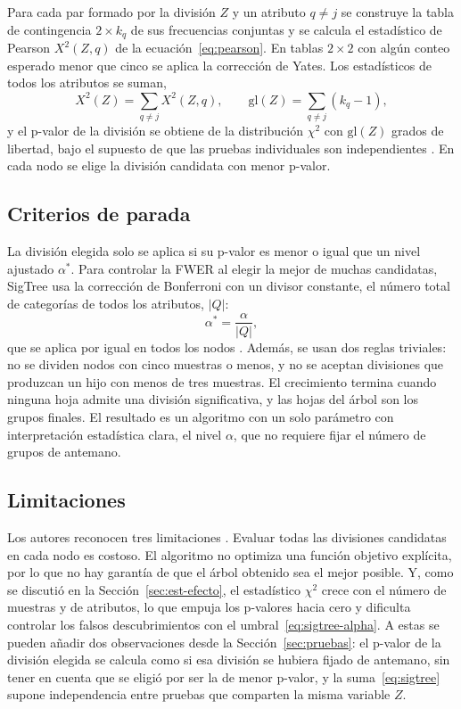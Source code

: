 Para cada par formado por la división $Z$ y un atributo $q \ne j$ se construye la
tabla de contingencia $2 \times k_q$ de sus frecuencias conjuntas y se calcula el
estadístico de Pearson $X^2(Z, q)$ de la ecuación~\eqref{eq:pearson}. En tablas
$2 \times 2$ con algún conteo esperado menor que cinco se aplica la corrección de
Yates. Los estadísticos de todos los atributos se suman,
\begin{equation}\label{eq:sigtree}
  X^2(Z) = \sum_{q \ne j} X^2(Z, q), \qquad
  \mathrm{gl}(Z) = \sum_{q \ne j} (k_q - 1),
\end{equation}
y el p-valor de la división se obtiene de la distribución $\chi^2$ con
$\mathrm{gl}(Z)$ grados de libertad, bajo el supuesto de que las pruebas
individuales son independientes \cite[Sec.~3.3]{Hu2025}. En cada nodo se elige la
división candidata con menor p-valor.

\subsection{Criterios de parada}

La división elegida solo se aplica si su p-valor es menor o igual que un nivel
ajustado $\alpha^\ast$. Para controlar la FWER al elegir la mejor de muchas
candidatas, SigTree usa la corrección de Bonferroni con un divisor constante,
el número total de categorías de todos los atributos, $|Q|$:
\begin{equation}\label{eq:sigtree-alpha}
  \alpha^\ast = \frac{\alpha}{|Q|} ,
\end{equation}
que se aplica por igual en todos los nodos \cite[Sec.~3.4]{Hu2025}. Además, se
usan dos reglas triviales: no se dividen nodos con cinco muestras o menos, y no se
aceptan divisiones que produzcan un hijo con menos de tres muestras. El
crecimiento termina cuando ninguna hoja admite una división significativa, y las
hojas del árbol son los grupos finales. El resultado es un algoritmo con un solo
parámetro con interpretación estadística clara, el nivel $\alpha$, que no
requiere fijar el número de grupos de antemano.

\subsection{Limitaciones}

Los autores reconocen tres limitaciones \cite[Sec.~5]{Hu2025}. Evaluar todas las
divisiones candidatas en cada nodo es costoso. El algoritmo no optimiza una
función objetivo explícita, por lo que no hay garantía de que el árbol obtenido
sea el mejor posible. Y, como se discutió en la Sección~\ref{sec:est-efecto}, el
estadístico $\chi^2$ crece con el número de muestras y de atributos, lo que empuja
los p-valores hacia cero y dificulta controlar los falsos descubrimientos con el
umbral~\eqref{eq:sigtree-alpha}. A estas se pueden añadir dos observaciones desde
la Sección~\ref{sec:pruebas}: el p-valor de la división elegida se calcula como si
esa división se hubiera fijado de antemano, sin tener en cuenta que se eligió por
ser la de menor p-valor, y la suma~\eqref{eq:sigtree} supone independencia entre
pruebas que comparten la misma variable $Z$.

